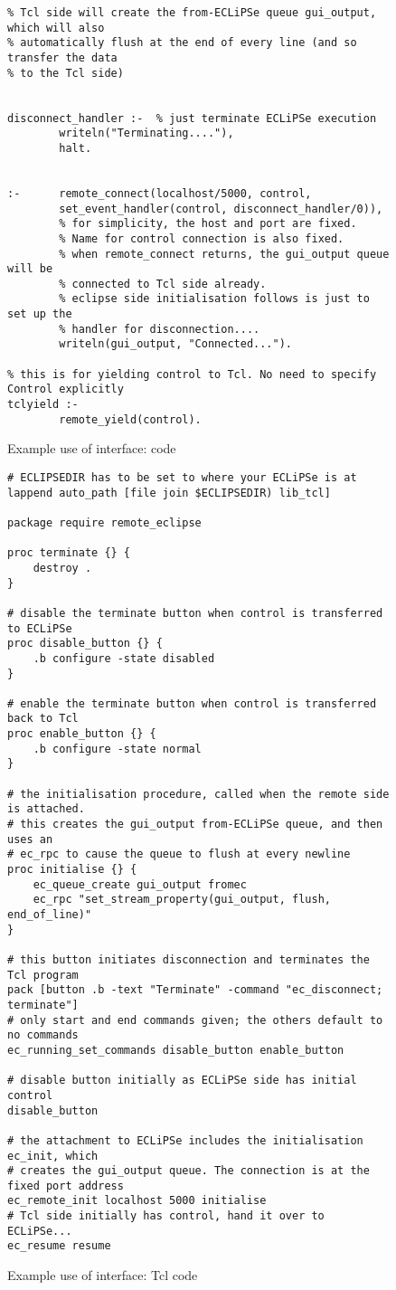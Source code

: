 \begin{figure}[htb]
\begin{verbatim}
% Tcl side will create the from-ECLiPSe queue gui_output, which will also
% automatically flush at the end of every line (and so transfer the data
% to the Tcl side)


disconnect_handler :-  % just terminate ECLiPSe execution
        writeln("Terminating...."),
        halt.


:-      remote_connect(localhost/5000, control, 
        set_event_handler(control, disconnect_handler/0)),
        % for simplicity, the host and port are fixed.
        % Name for control connection is also fixed.
        % when remote_connect returns, the gui_output queue will be
        % connected to Tcl side already.
        % eclipse side initialisation follows is just to set up the 
        % handler for disconnection....
        writeln(gui_output, "Connected...").

% this is for yielding control to Tcl. No need to specify Control explicitly
tclyield :-
        remote_yield(control).
\end{verbatim}
\caption{Example use of interface: {\eclipse} code}
\label{remote-eclipse}
\end{figure}


\begin{figure}[htb]
{\small
\begin{verbatim}
# ECLIPSEDIR has to be set to where your ECLiPSe is at
lappend auto_path [file join $ECLIPSEDIR) lib_tcl]

package require remote_eclipse 

proc terminate {} {
    destroy .
}

# disable the terminate button when control is transferred to ECLiPSe
proc disable_button {} {
    .b configure -state disabled
}

# enable the terminate button when control is transferred back to Tcl
proc enable_button {} {
    .b configure -state normal
}

# the initialisation procedure, called when the remote side is attached. 
# this creates the gui_output from-ECLiPSe queue, and then uses an
# ec_rpc to cause the queue to flush at every newline
proc initialise {} {
	ec_queue_create gui_output fromec
	ec_rpc "set_stream_property(gui_output, flush, end_of_line)"
}

# this button initiates disconnection and terminates the Tcl program
pack [button .b -text "Terminate" -command "ec_disconnect; terminate"] 
# only start and end commands given; the others default to no commands
ec_running_set_commands disable_button enable_button

# disable button initially as ECLiPSe side has initial control
disable_button  

# the attachment to ECLiPSe includes the initialisation ec_init, which
# creates the gui_output queue. The connection is at the fixed port address
ec_remote_init localhost 5000 initialise
# Tcl side initially has control, hand it over to ECLiPSe...
ec_resume resume
\end{verbatim}}
\caption{Example use of interface: Tcl code}
\label{remote-tcl}
\end{figure}

